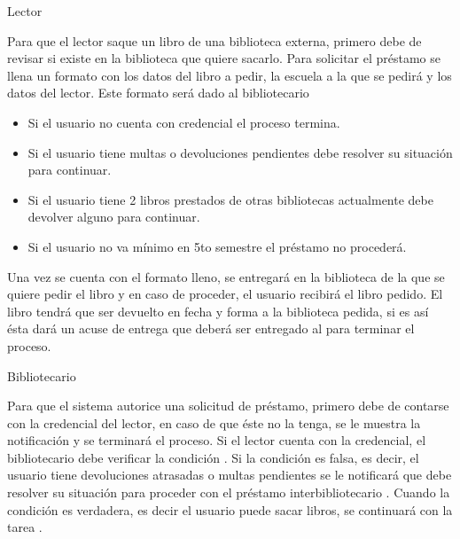 \begin{PDescripcion}

  \Ppaso Lector

    \begin{enumerate}
      \Ppaso[\itarea]  Para que el lector saque un libro de una biblioteca externa, primero debe de revisar si existe en la biblioteca que quiere sacarlo. 
      \Ppaso[\itarea]  Para solicitar el préstamo se llena un formato con los datos del libro a pedir, la escuela a la que se pedirá y los datos del lector. Este formato será dado al bibliotecario 
	\begin{itemize}
	  \item Si el usuario no cuenta con credencial el proceso termina.
	  \item Si el usuario tiene multas o devoluciones pendientes debe resolver su situación para continuar.
	  \item Si el usuario tiene 2 libros prestados de otras bibliotecas actualmente debe devolver alguno para continuar.
	  \item Si el usuario no va mínimo en 5to semestre  el préstamo no procederá.
	\end{itemize}
    \Ppaso[\itarea]  Una vez se cuenta con el formato lleno, se entregará en la biblioteca de la que se quiere pedir el libro y en caso de proceder, el usuario recibirá el libro pedido.
    \Ppaso[\itarea]  El libro tendrá que ser devuelto en fecha y forma a la biblioteca pedida, si es así ésta dará un acuse de entrega que deberá ser entregado al   para terminar el proceso.
    \end{enumerate}

  \Ppaso Bibliotecario

    \begin{enumerate}

      \Ppaso[\itarea]  Para que el sistema autorice una solicitud de préstamo, primero debe de contarse con la credencial del lector, en caso de que éste no la tenga, se le muestra la notificación   y se terminará el proceso. 
Si el lector cuenta con la credencial, el bibliotecario debe verificar la condición . Si la condición es falsa, es decir, el usuario tiene devoluciones atrasadas o multas pendientes se le notificará que debe resolver su situación para proceder con el préstamo interbibliotecario . Cuando la condición es verdadera, es decir el usuario puede sacar libros, se continuará con la tarea . 


\end{enumerate}
\end{PDescripcion}

